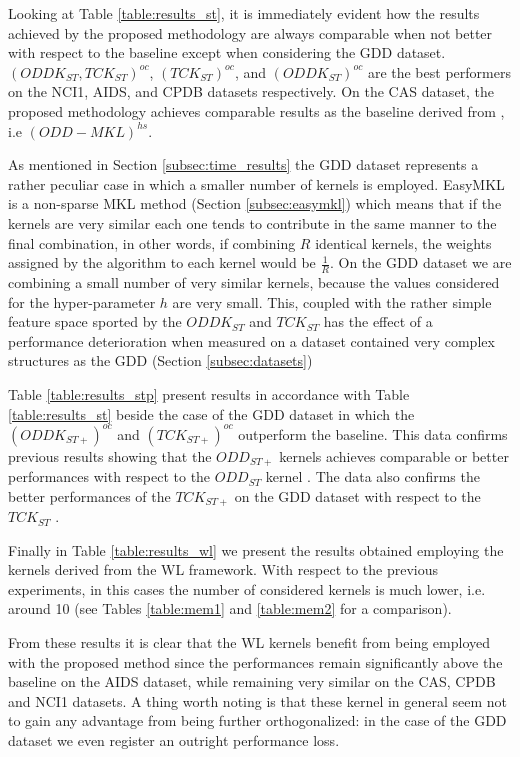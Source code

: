 Looking at Table \ref{table:results_st}, it is immediately evident how the results
achieved by the proposed methodology are always comparable when not better with respect
to the baseline except when considering the GDD dataset.
$(ODDK_{ST},TCK_{ST})^{oc}$, $(TCK_{ST})^{oc}$, and $(ODDK_{ST})^{oc}$ are the best performers on the NCI1,
AIDS, and CPDB datasets respectively.
On the CAS dataset, the proposed methodology achieves comparable results as the baseline derived from
\cite{gmkl}, i.e $(ODD-MKL)^{hs}$.

As mentioned in Section \ref{subsec:time_results} the GDD dataset represents a rather peculiar case
in which a smaller number of kernels is employed.
EasyMKL is a non-sparse MKL method (Section \ref{subsec:easymkl}) which means that
if the kernels are very similar each one tends to contribute in the same manner to
the final combination, in other words, if combining $R$ identical kernels,
the weights assigned by the algorithm to each kernel would be $\frac{1}{R}$.
On the GDD dataset we are combining a small number of very similar kernels, because
the values considered for the hyper-parameter $h$ are very small.
This, coupled with the rather simple feature space sported by the $ODDK_{ST}$ and 
$TCK_{ST}$ has the effect of a performance deterioration when measured on a 
dataset contained very complex structures as the GDD (Section \ref{subsec:datasets})

Table \ref{table:results_stp} present results in accordance with Table \ref{table:results_st}
beside the case of the GDD dataset in which the $(ODDK_{ST+})^{oc}$ and $(TCK_{ST+})^{oc}$
outperform the baseline.
This data confirms previous results showing that the $ODD_{ST+}$ kernels achieves
comparable or better performances with respect to the $ODD_{ST}$ kernel \cite{dasanmartino2015exploiting}.
The data also confirms the better performances of the $TCK_{ST+}$ on the GDD dataset
with respect to the $TCK_{ST}$ \cite{rtesselli}.

Finally in Table \ref{table:results_wl} we present the results obtained employing the 
kernels derived from the WL framework.
With respect to the previous experiments, in this cases the number of considered
kernels is much lower, i.e. around 10 (see Tables \ref{table:mem1} and \ref{table:mem2}
for a comparison).

From these results it is clear that the WL kernels benefit from being employed with the
proposed method since the performances remain significantly above the baseline
on the AIDS dataset, while remaining very similar on the CAS, CPDB and NCI1 datasets.
A thing worth noting is that these kernel in general seem not to gain any advantage
from being further orthogonalized: in the case of the GDD dataset we even register an
outright performance loss.

